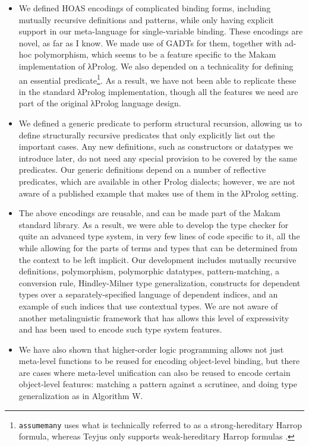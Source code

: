 \begin{itemize}
\item
  We defined HOAS encodings of complicated binding forms, including
  mutually recursive definitions and patterns, while only having
  explicit support in our meta-language for single-variable binding.
  These encodings are novel, as far as I know. We made use of GADTs for
  them, together with ad-hoc polymorphism, which seems to be a feature
  specific to the Makam implementation of \foreignlanguage{greek}{λ}Prolog. We also depended on a
  technicality for defining an essential
  predicate\footnote{\texttt{assumemany} uses what is technically referred to
    as a strong-hereditary Harrop formula, whereas Teyjus only supports weak-hereditary
    Harrop formulas \citep{nadathur1999system}.}. As a result, we have
  not been able to replicate these in the standard \foreignlanguage{greek}{λ}Prolog
  implementation, though all the features we need are part of the
  original \foreignlanguage{greek}{λ}Prolog language design.
\item
  We defined a generic predicate to perform structural recursion,
  allowing us to define structurally recursive predicates that only
  explicitly list out the important cases. Any new definitions, such as
  constructors or datatypes we introduce later, do not need any special
  provision to be covered by the same predicates. Our generic
  definitions depend on a number of reflective predicates, which are
  available in other Prolog dialects; however, we are not aware of a
  published example that makes use of them in the \foreignlanguage{greek}{λ}Prolog setting.
\item
  The above encodings are reusable, and can be made part of the Makam
  standard library. As a result, we were able to develop the type
  checker for quite an advanced type system, in very few lines of code
  specific to it, all the while allowing for the parts of terms and
  types that can be determined from the context to be left implicit. Our
  development includes mutually recursive definitions, polymorphism,
  polymorphic datatypes, pattern-matching, a conversion rule,
  Hindley-Milner type generalization, constructs for dependent types
  over a separately-specified language of dependent indices, and an
  example of such indices that use contextual types. We are not aware of
  another metalinguistic framework that has allows this level of
  expressivity and has been used to encode such type system features.
\item
  We have also shown that higher-order logic programming allows not just
  meta-level functions to be reused for encoding object-level binding,
  but there are cases where meta-level unification can also be reused to
  encode certain object-level features: matching a pattern against a
  scrutinee, and doing type generalization as in Algorithm W.
\end{itemize}

